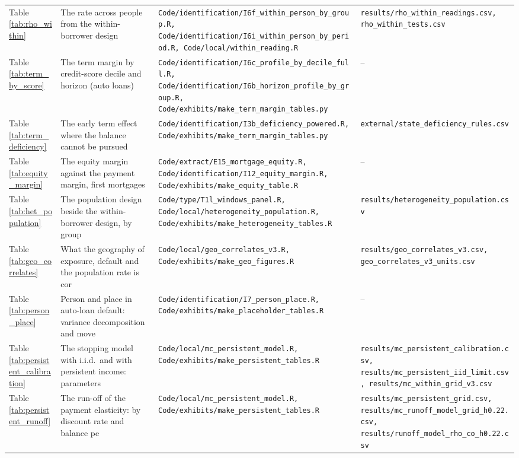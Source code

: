 \begin{longtable}{@{}p{}p{}p{}p{}@{}}
Table \ref{tab:rho_within} & The rate across people from the within-borrower design & \texttt{Code/identification/I6f\_within\_person\_by\_group.R, Code/identification/I6i\_within\_person\_by\_period.R, Code/local/within\_reading.R} & \texttt{results/rho\_within\_readings.csv, rho\_within\_tests.csv} \\
Table \ref{tab:term_by_score} & The term margin by credit-score decile and horizon (auto loans) & \texttt{Code/identification/I6c\_profile\_by\_decile\_full.R, Code/identification/I6b\_horizon\_profile\_by\_group.R, Code/exhibits/make\_term\_margin\_tables.py} & -- \\
Table \ref{tab:term_deficiency} & The early term effect where the balance cannot be pursued & \texttt{Code/identification/I3b\_deficiency\_powered.R, Code/exhibits/make\_term\_margin\_tables.py} & \texttt{external/state\_deficiency\_rules.csv} \\
Table \ref{tab:equity_margin} & The equity margin against the payment margin, first mortgages & \texttt{Code/extract/E15\_mortgage\_equity.R, Code/identification/I12\_equity\_margin.R, Code/exhibits/make\_equity\_table.R} & -- \\
Table \ref{tab:het_population} & The population design beside the within-borrower design, by group & \texttt{Code/type/T1l\_windows\_panel.R, Code/local/heterogeneity\_population.R, Code/exhibits/make\_heterogeneity\_tables.R} & \texttt{results/heterogeneity\_population.csv} \\
Table \ref{tab:geo_correlates} & What the geography of exposure, default and the population rate is cor & \texttt{Code/local/geo\_correlates\_v3.R, Code/exhibits/make\_geo\_figures.R} & \texttt{results/geo\_correlates\_v3.csv, geo\_correlates\_v3\_units.csv} \\
Table \ref{tab:person_place} & Person and place in auto-loan default: variance decomposition and move & \texttt{Code/identification/I7\_person\_place.R, Code/exhibits/make\_placeholder\_tables.R} & -- \\
Table \ref{tab:persistent_calibration} & The stopping model with i.i.d.\ and with persistent income: parameters & \texttt{Code/local/mc\_persistent\_model.R, Code/exhibits/make\_persistent\_tables.R} & \texttt{results/mc\_persistent\_calibration.csv, results/mc\_persistent\_iid\_limit.csv, results/mc\_within\_grid\_v3.csv} \\
Table \ref{tab:persistent_runoff} & The run-off of the payment elasticity: by discount rate and balance pe & \texttt{Code/local/mc\_persistent\_model.R, Code/exhibits/make\_persistent\_tables.R} & \texttt{results/mc\_persistent\_grid.csv, results/mc\_runoff\_model\_grid\_h0.22.csv, results/runoff\_model\_rho\_co\_h0.22.csv} \\

\end{longtable}

